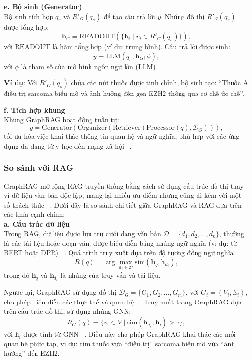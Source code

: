 \documentclass[a4paper]{article}
\begin{document}
\textbf{e.  Bộ sinh (Generator)}\\
Bộ sinh tích hợp $q_s$ và $R'_G(q_s)$ để tạo câu trả lời $y$. Nhúng đồ thị $R'_G(q_s)$ được tổng hợp:
\begin{equation}
    \mathbf{h}_G = \text{READOUT}(\{\mathbf{h}_i \mid v_i \in R'_G(q_s)\}),
\end{equation}
với $\text{READOUT}$ là hàm tổng hợp (ví dụ: trung bình). Câu trả lời được sinh:
\begin{equation}
    y = \text{LLM}(q_s, \mathbf{h}_G; \phi),
\end{equation}
với $\phi$ là tham số của mô hình ngôn ngữ lớn (LLM) ~\cite{Brown2020GPT}.

\textbf{Ví dụ}: Với $R'_G(q_s)$ chứa các nút thuốc được tinh chỉnh, bộ sinh tạo: ``Thuốc A điều trị sarcoma biểu mô và ảnh hưởng đến gen EZH2 thông qua cơ chế ức chế''.

\textbf{f.  Tích hợp khung}\\
Khung GraphRAG hoạt động tuần tự:
\begin{equation}
    y = \text{Generator}(\text{Organizer}(\text{Retriever}(\text{Processor}(q), \mathcal{D}_G))),
\end{equation}
tối ưu hóa việc khai thác thông tin quan hệ và ngữ nghĩa, phù hợp với các ứng dụng đa dạng từ y học đến mạng xã hội ~\cite{Chen2024GraphRAG}.

\subsubsection{So sánh với RAG}
GraphRAG mở rộng RAG truyền thống bằng cách sử dụng cấu trúc đồ thị thay vì dữ liệu văn bản độc lập, mang lại nhiều ưu điểm nhưng cũng đi kèm với một số thách thức ~\cite{Chen2024GraphRAG}. Dưới đây là so sánh chi tiết giữa GraphRAG và RAG dựa trên các khía cạnh chính:\\
\textbf{a.  Cấu trúc dữ liệu\\}
Trong RAG, dữ liệu được lưu trữ dưới dạng văn bản $\mathcal{D} = \{d_1, d_2, \dots, d_n\}$, thường là các tài liệu hoặc đoạn văn, được biểu diễn bằng nhúng ngữ nghĩa (ví dụ: từ BERT hoặc DPR) ~\cite{Karpukhin2020DPR}. Quá trình truy xuất dựa trên độ tương đồng ngữ nghĩa:
\begin{equation}
    R(q) = \arg\max_{d_i \in \mathcal{D}} \text{sim}(\mathbf{h}_q, \mathbf{h}_{d_i}),
\end{equation}
trong đó $\mathbf{h}_q$ và $\mathbf{h}_{d_i}$ là nhúng của truy vấn và tài liệu.

Ngược lại, GraphRAG sử dụng đồ thị $\mathcal{D}_G = \{G_1, G_2, \dots, G_m\}$, với $G_i = (V_i, E_i)$, cho phép biểu diễn các thực thể và quan hệ ~\cite{Liu2023GraphSurvey}. Truy xuất trong GraphRAG dựa trên cấu trúc đồ thị, sử dụng nhúng GNN:
\begin{equation}
    R_G(q) = \{ v_i \in V \mid \text{sim}(\mathbf{h}_{q_s}, \mathbf{h}_i) > \tau \},
\end{equation}
với $\mathbf{h}_i$ được tính từ GNN ~\cite{Wu2020GNN}. Điều này cho phép GraphRAG khai thác các mối quan hệ phức tạp, ví dụ: tìm thuốc vừa ``điều trị'' sarcoma biểu mô vừa ``ảnh hưởng'' đến EZH2.
\end{document}
